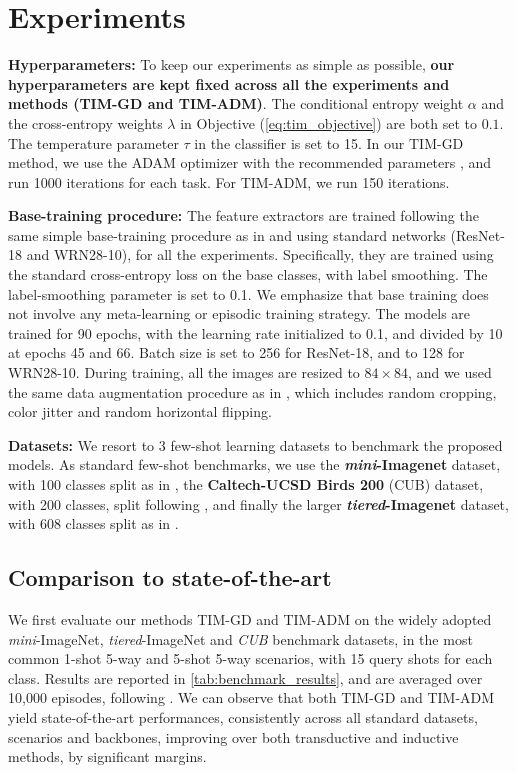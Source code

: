 \documentclass{article}
\begin{document}
 
\section{Experiments}

    \textbf{Hyperparameters: } To keep our experiments as simple as possible, \textbf{our hyperparameters are kept fixed across all the experiments and methods (TIM-GD and TIM-ADM)}. The conditional entropy weight $\alpha$ and the cross-entropy weights $\lambda$ in Objective (\ref{eq:tim_objective}) are both set to $0.1$. The temperature parameter $\tau$ in the classifier is set to 15. 
In our TIM-GD method, we use the ADAM optimizer with the recommended parameters \cite{kingma2014adam}, and run 1000 iterations for each task. For TIM-ADM, we run 150 iterations.
    
    \textbf{Base-training procedure:} The feature extractors are trained following the same simple base-training procedure as in \cite{Laplacian} and using standard networks (ResNet-18 and WRN28-10), for all the experiments. Specifically, they are trained using the standard cross-entropy loss on the base classes, with label smoothing. The label-smoothing parameter is set to 0.1. We emphasize that base training does not involve any meta-learning or episodic training strategy. The models are trained for 90 epochs, with the learning rate initialized to 0.1, and divided by 10 at epochs 45 and 66. Batch size is set to 256 for ResNet-18, and to 128 for WRN28-10. During training, all the images are resized to $84 \times 84$, and we used the same data augmentation procedure as in \cite{Laplacian}, which includes random cropping, color jitter  and random horizontal flipping. 

    \textbf{Datasets: } We resort to 3 few-shot learning  datasets to benchmark the proposed models. As standard few-shot benchmarks, we use the \textbf{\textit{mini}-Imagenet} \cite{matching_net} dataset, with 100 classes split as in \cite{ravi2016optimization}, the \textbf{Caltech-UCSD Birds 200} \cite{cub} (CUB) dataset, with 200 classes, split following \cite{closer_look}, and finally the larger \textbf{\textit{tiered}-Imagenet} dataset, with 608 classes split as in \cite{tiered_imagenet}.


    \subsection{Comparison to state-of-the-art}\label{sec:benchmark}

        We first evaluate our methods TIM-GD and TIM-ADM on the widely adopted \textit{mini}-ImageNet, \textit{tiered}-ImageNet and \textit{CUB} benchmark datasets, in the most common 1-shot 5-way and 5-shot 5-way scenarios, with 15 query shots for each class. Results are reported in \autoref{tab:benchmark_results}, and are averaged over 10,000 episodes, following \cite{simpleshot}. We can observe that both TIM-GD and TIM-ADM yield state-of-the-art performances, consistently across all standard datasets, scenarios and backbones, improving over both transductive and inductive methods, by significant margins. 
\end{document}
